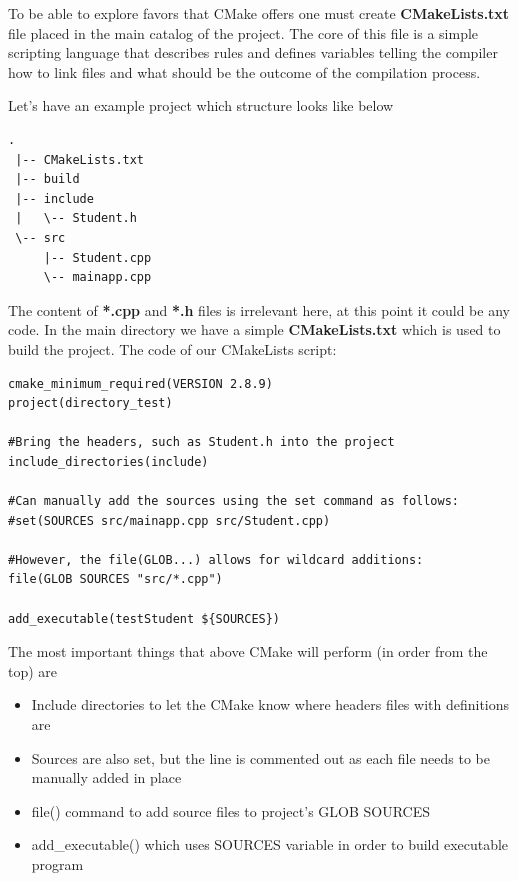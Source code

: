 \documentclass[a4paper,12pt]{article}
\begin{document}
{{\bigskip
To be able to explore favors that CMake offers one must create \textbf{CMakeLists.txt} file placed in the main catalog of the project. The core of this file is a simple scripting language that describes rules and defines variables telling the compiler how to link files and what should be the outcome of the compilation process.

\bigskip
Let's have an example project\cite{cmakeintroduction} which structure looks like below\newline
\begin{lstlisting}[frame=single, caption={Example CMake project structure}, captionpos=b]
 .
 |-- CMakeLists.txt
 |-- build
 |-- include
 |   \-- Student.h
 \-- src
     |-- Student.cpp
     \-- mainapp.cpp
\end{lstlisting}

\bigskip
The content of \textbf{*.cpp} and \textbf{*.h} files is irrelevant here, at this point it could be any code. In the main directory we have a simple \textbf{CMakeLists.txt} which is used to build the project. The code of our CMakeLists script:\newline

\begin{lstlisting}[frame=single, caption={CMakeLists.txt of example project}, captionpos=b]
cmake_minimum_required(VERSION 2.8.9)
project(directory_test)

#Bring the headers, such as Student.h into the project
include_directories(include)

#Can manually add the sources using the set command as follows:
#set(SOURCES src/mainapp.cpp src/Student.cpp)

#However, the file(GLOB...) allows for wildcard additions:
file(GLOB SOURCES "src/*.cpp")

add_executable(testStudent ${SOURCES})
\end{lstlisting}
\bigskip
The most important things that above CMake will perform (in order from the top) are
\begin{itemize}
	\item Include directories to let the CMake know where headers files with definitions are
	\item Sources are also set, but the line is commented out as each file needs to be manually added in place
	\item file() command to add source files to project's GLOB SOURCES
	\item add\_executable() which uses SOURCES variable in order to build executable program
\end{itemize}


}}
\end{document}
